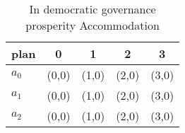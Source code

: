 \documentclass[a4paper]{article}
\begin{document}
\begin{table}
\begin{adjustbox}{width=0.6\columnwidth}
\begin{tabular}{|l|l|l|l|l|}
\hline
\textbf{plan} & \multicolumn{1}{c|}{\textbf{0}} & \multicolumn{1}{c|}{\textbf{1}} & \multicolumn{1}{c|}{\textbf{2}} & \multicolumn{1}{c|}{\textbf{3}} \\ \hline
\textbf{$a_0$}  & (0,0) & (1,0) & (2,0) & (3,0) \\ \hline
\textbf{$a_1$}  & (0,0) & (1,0) & (2,0) & (3,0) \\ \hline
\textbf{$a_2$}  & (0,0) & (1,0) & (2,0) & (3,0) \\ \hline
\end{tabular}
\end{adjustbox}
\caption{In democratic governance prosperity Accommodation
}
\end{table}
\end{document}

